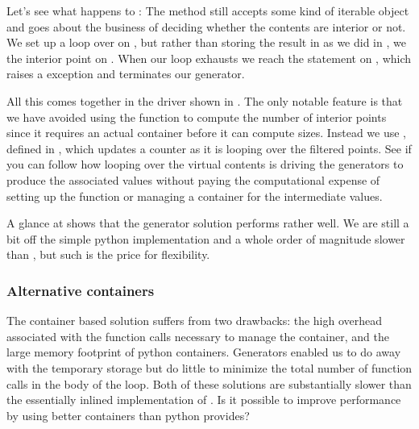 Let's see what happens to :
%
%
The method  still accepts some kind of iterable object  and
goes about the business of deciding whether the contents are interior or not. We set up a loop
over  on , but rather than storing the
result in  as we did in , we 
the interior point on .  When our loop exhausts
 we reach the  statement on
, which raises a  exception and
terminates our generator.

All this comes together in the driver shown in . The only notable
feature is that we have avoided using the function  to compute the number of
interior points since it requires an actual container before it can compute sizes. Instead we
use , defined in , which updates a counter
as it is looping over the filtered points. See if you can follow how looping over the virtual
contents is driving the generators to produce the associated values without paying the
computational expense of setting up the function or managing a container for the intermediate
values.
%

A glance at  shows that the generator solution performs rather well. We
are still a bit off the simple python implementation and a whole order of magnitude slower than
\cpp, but such is the price for flexibility.

\subsubsection{Alternative containers}
\label{sec:classes:alternatives}

The container based solution suffers from two drawbacks: the high overhead associated with the
function calls necessary to manage the container, and the large memory footprint of python
containers. Generators enabled us to do away with the temporary storage but do little to
minimize the total number of function calls in the body of the loop. Both of these solutions
are substantially slower than the essentially inlined implementation of .
Is it possible to improve performance by using better containers than python provides?

